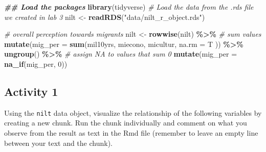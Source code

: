 \documentclass[
]{book}
\newenvironment{Shaded}{\begin{snugshade}}{\end{snugshade}}
\newcommand{\AttributeTok}[1]{\textcolor[rgb]{0.13,0.29,0.53}{#1}}
\newcommand{\CommentTok}[1]{\textcolor[rgb]{0.56,0.35,0.01}{\textit{#1}}}
\newcommand{\DecValTok}[1]{\textcolor[rgb]{0.00,0.00,0.81}{#1}}
\newcommand{\DocumentationTok}[1]{\textcolor[rgb]{0.56,0.35,0.01}{\textbf{\textit{#1}}}}
\newcommand{\FunctionTok}[1]{\textcolor[rgb]{0.13,0.29,0.53}{\textbf{#1}}}
\newcommand{\NormalTok}[1]{#1}
\newcommand{\OtherTok}[1]{\textcolor[rgb]{0.56,0.35,0.01}{#1}}
\newcommand{\SpecialCharTok}[1]{\textcolor[rgb]{0.81,0.36,0.00}{\textbf{#1}}}
\newcommand{\StringTok}[1]{\textcolor[rgb]{0.31,0.60,0.02}{#1}}
\begin{document}
\begin{Shaded}
\begin{Highlighting}[]
\DocumentationTok{\#\# Load the packages}
\FunctionTok{library}\NormalTok{(tidyverse)}
\CommentTok{\# Load the data from the .rds file we created in lab 3}
\NormalTok{nilt }\OtherTok{\textless{}{-}} \FunctionTok{readRDS}\NormalTok{(}\StringTok{"data/nilt\_r\_object.rds"}\NormalTok{)}
\end{Highlighting}
\end{Shaded}

\begin{Shaded}
\end{Shaded}

\begin{Shaded}
\begin{Highlighting}[]
\CommentTok{\# overall perception towards migrants}
\NormalTok{nilt }\OtherTok{\textless{}{-}} \FunctionTok{rowwise}\NormalTok{(nilt) }\SpecialCharTok{\%\textgreater{}\%} 
  \CommentTok{\# sum values}
  \FunctionTok{mutate}\NormalTok{(}\AttributeTok{mig\_per =} \FunctionTok{sum}\NormalTok{(mil10yrs, miecono, micultur, }\AttributeTok{na.rm =}\NormalTok{ T )) }\SpecialCharTok{\%\textgreater{}\%} 
  \FunctionTok{ungroup}\NormalTok{() }\SpecialCharTok{\%\textgreater{}\%} 
  \CommentTok{\# assign NA to values that sum 0}
  \FunctionTok{mutate}\NormalTok{(}\AttributeTok{mig\_per =}  \FunctionTok{na\_if}\NormalTok{(mig\_per, }\DecValTok{0}\NormalTok{))}
\end{Highlighting}
\end{Shaded}

\hypertarget{activity-1-5}{%
\subsection{Activity 1}\label{activity-1-5}}

Using the \texttt{nilt} data object, visualize the relationship of the following variables by creating a new chunk. Run the chunk individually and comment on what you observe from the result as text in the Rmd file (remember to leave an empty line between your text and the chunk).
\end{document}
